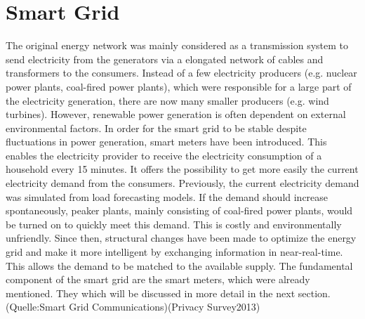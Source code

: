 \section{Smart Grid}
The original energy network was mainly considered as a transmission system to send electricity from the generators via a elongated network of cables and transformers to the consumers.%
Instead of a few electricity producers (e.g. nuclear power plants, coal-fired power plants), which were responsible for a large part of the electricity generation, there are now many smaller producers (e.g. wind turbines). %
However, renewable power generation is often dependent on external environmental factors. In order for the smart grid to be stable despite fluctuations in power generation, smart meters have been introduced.
This enables the electricity provider to receive the electricity consumption of a household every 15 minutes. It offers the possibility to get more easily the current electricity demand from the consumers. Previously, the current electricity demand was simulated from load forecasting models. If the demand should increase spontaneously, peaker plants, mainly consisting of coal-fired power plants, would be turned on to quickly meet this demand. This is costly and environmentally unfriendly. 
Since then, structural changes have been made to optimize the energy grid and make it more intelligent by exchanging information in near-real-time. This allows the demand to be matched to the available supply. The fundamental component of the smart grid are the smart meters, which were already mentioned. They which will be discussed in more detail in the next section.(Quelle:Smart Grid Communications)(Privacy Survey2013)

